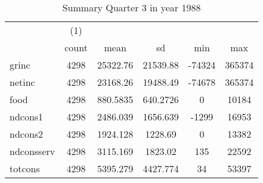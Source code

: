 \begin{table}[htbp]\centering
\def\sym#1{\ifmmode^{#1}\else\(^{#1}\)\fi}
\caption{Summary Quarter 3 in year 1988 \label{sum\_Q3\_y1988}}
\begin{tabular}{l*{1}{ccccc}}
\hline\hline
            &\multicolumn{1}{c}{(1)}&            &            &            &            \\
            &       count&        mean&          sd&         min&         max\\
\hline
grinc       &        4298&    25322.76&    21539.88&      -74324&      365374\\
netinc      &        4298&    23168.26&    19488.49&      -74678&      365374\\
food        &        4298&    880.5835&    640.2726&           0&       10184\\
ndcons1     &        4298&    2486.039&    1656.639&       -1299&       16953\\
ndcons2     &        4298&    1924.128&     1228.69&           0&       13382\\
ndconsserv  &        4298&    3115.169&     1823.02&         135&       22592\\
totcons     &        4298&    5395.279&    4427.774&          34&       53397\\
\hline\hline
\end{tabular}
\end{table}
